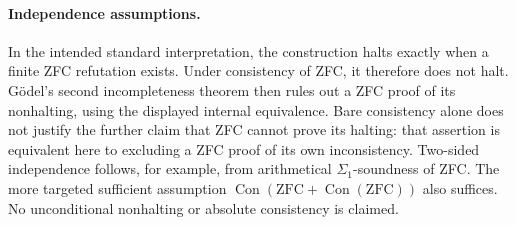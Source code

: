 \paragraph{Independence assumptions.}
In the intended standard interpretation, the construction halts exactly
when a finite ZFC refutation exists. Under consistency of ZFC, it therefore
does not halt. G\"odel's second incompleteness theorem then rules out a ZFC
proof of its nonhalting, using the displayed internal equivalence. Bare
consistency alone does not justify the further claim that ZFC cannot prove
its halting: that assertion is equivalent here to excluding a ZFC proof of
its own inconsistency. Two-sided independence follows, for example, from
arithmetical $\Sigma_1$-soundness of ZFC. The more targeted sufficient
assumption $\operatorname{Con}(\mathrm{ZFC}+\operatorname{Con}(\mathrm{ZFC}))$
also suffices. No unconditional nonhalting or absolute consistency is claimed.

